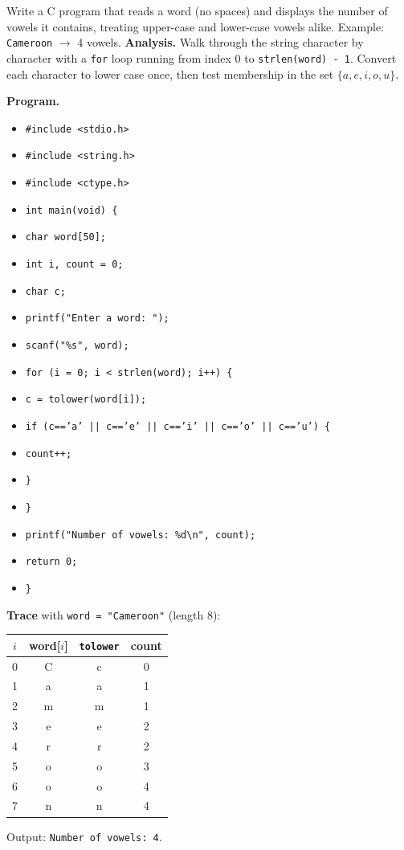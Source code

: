 \documentclass[11pt]{article}
\begin{document}
\begin{exoresolu}
Write a C program that reads a word (no spaces) and displays the number of vowels it contains, treating upper-case and lower-case vowels alike. Example: \texttt{Cameroon} $\rightarrow$ 4 vowels.
\tcblower
\textbf{Analysis.} Walk through the string character by character with a \texttt{for} loop running from index $0$ to \texttt{strlen(word) - 1}. Convert each character to lower case once, then test membership in the set $\{a, e, i, o, u\}$.

\textbf{Program.}
\begin{itemize}
\item \texttt{\#include <stdio.h>}
\item \texttt{\#include <string.h>}
\item \texttt{\#include <ctype.h>}
\item \texttt{int main(void) \{}
\item \texttt{\quad char word[50];}
\item \texttt{\quad int i, count = 0;}
\item \texttt{\quad char c;}
\item \texttt{\quad printf("Enter a word: ");}
\item \texttt{\quad scanf("\%s", word);}
\item \texttt{\quad for (i = 0; i < strlen(word); i++) \{}
\item \texttt{\quad\quad c = tolower(word[i]);}
\item \texttt{\quad\quad if (c=='a' || c=='e' || c=='i' || c=='o' || c=='u') \{}
\item \texttt{\quad\quad\quad count++;}
\item \texttt{\quad\quad \}}
\item \texttt{\quad \}}
\item \texttt{\quad printf("Number of vowels: \%d\textbackslash n", count);}
\item \texttt{\quad return 0;}
\item \texttt{\}}
\end{itemize}

\textbf{Trace} with \texttt{word = "Cameroon"} (length 8):
\begin{center}
\begin{tabular}{|c|c|c|c|}
\hline
\rowcolor{popblueL} $i$ & word[$i$] & \texttt{tolower} & count \\ \hline
0 & C & c & 0 \\ \hline
1 & a & a & 1 \\ \hline
2 & m & m & 1 \\ \hline
3 & e & e & 2 \\ \hline
4 & r & r & 2 \\ \hline
5 & o & o & 3 \\ \hline
6 & o & o & 4 \\ \hline
7 & n & n & 4 \\ \hline
\end{tabular}
\end{center}
Output: \texttt{Number of vowels: 4}.


\end{exoresolu}
\end{document}

